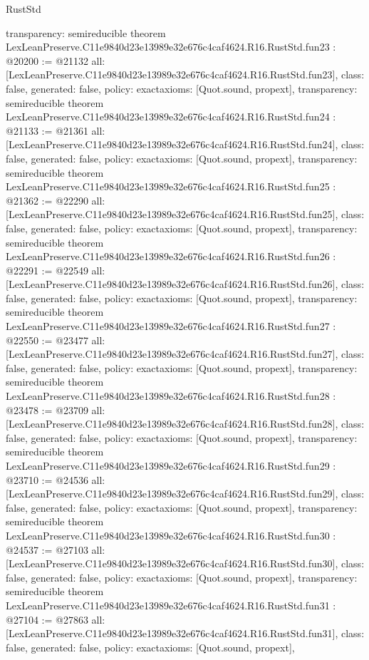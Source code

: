 \begin{lexlean}{RustStd}
\begin{coremodule}
{  transparency: semireducible
}
theorem LexLeanPreserve.C11e9840d23e13989e32e676c4caf4624.R16.RustStd.fun23 : @20200 := @21132 {
  all: [LexLeanPreserve.C11e9840d23e13989e32e676c4caf4624.R16.RustStd.fun23],
  class: false,
  generated: false,
  policy: exact{axioms: [Quot.sound, propext]},
  transparency: semireducible
}
theorem LexLeanPreserve.C11e9840d23e13989e32e676c4caf4624.R16.RustStd.fun24 : @21133 := @21361 {
  all: [LexLeanPreserve.C11e9840d23e13989e32e676c4caf4624.R16.RustStd.fun24],
  class: false,
  generated: false,
  policy: exact{axioms: [Quot.sound, propext]},
  transparency: semireducible
}
theorem LexLeanPreserve.C11e9840d23e13989e32e676c4caf4624.R16.RustStd.fun25 : @21362 := @22290 {
  all: [LexLeanPreserve.C11e9840d23e13989e32e676c4caf4624.R16.RustStd.fun25],
  class: false,
  generated: false,
  policy: exact{axioms: [Quot.sound, propext]},
  transparency: semireducible
}
theorem LexLeanPreserve.C11e9840d23e13989e32e676c4caf4624.R16.RustStd.fun26 : @22291 := @22549 {
  all: [LexLeanPreserve.C11e9840d23e13989e32e676c4caf4624.R16.RustStd.fun26],
  class: false,
  generated: false,
  policy: exact{axioms: [Quot.sound, propext]},
  transparency: semireducible
}
theorem LexLeanPreserve.C11e9840d23e13989e32e676c4caf4624.R16.RustStd.fun27 : @22550 := @23477 {
  all: [LexLeanPreserve.C11e9840d23e13989e32e676c4caf4624.R16.RustStd.fun27],
  class: false,
  generated: false,
  policy: exact{axioms: [Quot.sound, propext]},
  transparency: semireducible
}
theorem LexLeanPreserve.C11e9840d23e13989e32e676c4caf4624.R16.RustStd.fun28 : @23478 := @23709 {
  all: [LexLeanPreserve.C11e9840d23e13989e32e676c4caf4624.R16.RustStd.fun28],
  class: false,
  generated: false,
  policy: exact{axioms: [Quot.sound, propext]},
  transparency: semireducible
}
theorem LexLeanPreserve.C11e9840d23e13989e32e676c4caf4624.R16.RustStd.fun29 : @23710 := @24536 {
  all: [LexLeanPreserve.C11e9840d23e13989e32e676c4caf4624.R16.RustStd.fun29],
  class: false,
  generated: false,
  policy: exact{axioms: [Quot.sound, propext]},
  transparency: semireducible
}
theorem LexLeanPreserve.C11e9840d23e13989e32e676c4caf4624.R16.RustStd.fun30 : @24537 := @27103 {
  all: [LexLeanPreserve.C11e9840d23e13989e32e676c4caf4624.R16.RustStd.fun30],
  class: false,
  generated: false,
  policy: exact{axioms: [Quot.sound, propext]},
  transparency: semireducible
}
theorem LexLeanPreserve.C11e9840d23e13989e32e676c4caf4624.R16.RustStd.fun31 : @27104 := @27863 {
  all: [LexLeanPreserve.C11e9840d23e13989e32e676c4caf4624.R16.RustStd.fun31],
  class: false,
  generated: false,
  policy: exact{axioms: [Quot.sound, propext]},
}
\end{coremodule}
\end{lexlean}
